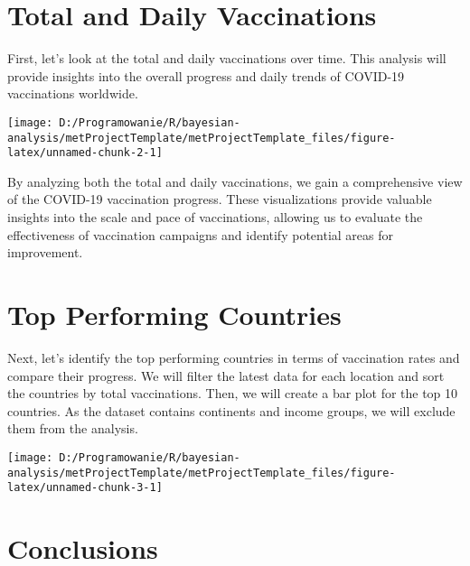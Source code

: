 \documentclass[
  10pt,
  dvipsnames,enabledeprecatedfontcommands]{scrartcl}
\begin{document}
\newpage

\hypertarget{total-and-daily-vaccinations}{%
\section{Total and Daily
Vaccinations}\label{total-and-daily-vaccinations}}

First, let's look at the total and daily vaccinations over time. This
analysis will provide insights into the overall progress and daily
trends of COVID-19 vaccinations worldwide.

\begin{center}\texttt{[image: D:/Programowanie/R/bayesian-analysis/metProjectTemplate/metProjectTemplate\_files/figure-latex/unnamed-chunk-2-1]} \end{center}

By analyzing both the total and daily vaccinations, we gain a
comprehensive view of the COVID-19 vaccination progress. These
visualizations provide valuable insights into the scale and pace of
vaccinations, allowing us to evaluate the effectiveness of vaccination
campaigns and identify potential areas for improvement. \newpage

\hypertarget{top-performing-countries}{%
\section{Top Performing Countries}\label{top-performing-countries}}

Next, let's identify the top performing countries in terms of
vaccination rates and compare their progress. We will filter the latest
data for each location and sort the countries by total vaccinations.
Then, we will create a bar plot for the top 10 countries. As the dataset
contains continents and income groups, we will exclude them from the
analysis.

\vspace{1mm}
\footnotesize

\begin{flushleft}\texttt{[image: D:/Programowanie/R/bayesian-analysis/metProjectTemplate/metProjectTemplate\_files/figure-latex/unnamed-chunk-3-1]} \end{flushleft}
\normalsize
\newpage

\hypertarget{conclusions}{%
\section*{Conclusions}\label{conclusions}}
\end{document}
